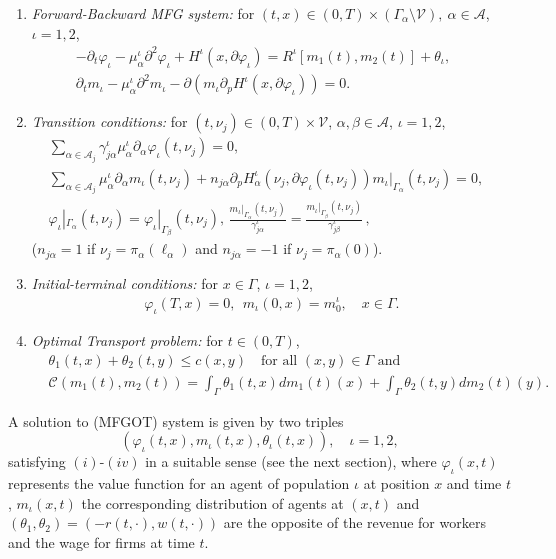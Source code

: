 \documentclass[smallextended,referee,envcountsect,]{svjour3}
\newcommand{\G}{\Gamma}
\newcommand{\cA}{{\mathcal A}}
\newcommand{\cC}{{\mathcal C}}
\newcommand{\cV}{{\mathcal V}}
\renewcommand{\phi}{\varphi}
\renewcommand{\a}{{\alpha}}
\renewcommand{\b}{{\beta}}
\renewcommand{\th}{\theta}
\begin{document}
\begin{enumerate}
\item[$(i)$] {\it Forward-Backward MFG system:} for $(t, x)\in (0, T)\times(\Gamma_{\a}\setminus\cV),\ \a\in\cA$, $\iota=1,2$,
\begin{align*}
	&-\partial_t\phi_\iota-\mu^\iota_{\a}\partial^2\phi_\iota+H^\iota(x, \partial\phi_\iota)=R^\iota[m_1(t),m_2(t)]+\th_\iota,\qquad   \\
	&\partial_tm_\iota-\mu^\iota_{\a}\partial^2m_\iota-\partial(m_\iota\partial_pH^\iota(x, \partial\phi_\iota))=0.
\end{align*}
\item[$(ii)$] {\it Transition conditions: }for $(t, \nu_j)\in (0, T)\times\cV$, $\a,\b\in\cA$,  $\iota=1,2$,
\begin{align*}
	&\sum_{\a\in\cA_j}\gamma^\iota_{j\a}\mu^\iota_{\a}\partial_{\a}\phi_\iota(t, \nu_j)=0,\qquad &\\
	&\sum_{\a\in\cA_j}\mu^\iota_{\a}\partial_{\a}m_\iota(t, \nu_j)+n_{j\a}\partial_{p}H_\a^\iota\left(\nu_j, \partial\phi_\iota(t, \nu_j)\right)m_\iota|_{\Gamma_{\a}}(t, \nu_j)=0,\qquad&\\
	&\phi_\iota|_{\Gamma_{\a}}(t, \nu_j)=\phi_\iota|_{\Gamma_{\beta}}(t, \nu_j), \,\frac{m_\iota|_{\Gamma_{\a}}(t, \nu_j)}{\gamma^\iota_{j\a}}=\frac{m_\iota|_{\Gamma_\beta}(t, \nu_j)}{\gamma^\iota_{j\beta}}\, ,
\end{align*}
($n_{j\a}=1$ if  $\nu_j =\pi_{\alpha} (\ell_\alpha)$ 
and $n_{j\a}=-1$ if $\nu_j =    \pi_{\alpha} (0)$).
\item[$(iii)$] {\it Initial-terminal conditions:} for $x\in\Gamma$, $\iota=1,2$,
\begin{align*}
	\phi_\iota(T, x)=0, \ \ m_\iota(0, x)=m_0^\iota,\quad x\in\G.
\end{align*}
\item[$(iv)$] {\it Optimal Transport problem:} for $t\in (0, T)$,
\begin{align*}
	&\th_1(t, x)+\th_2(t, y)\leq c(x, y)\quad \text{for all $(x,y)\in\G$ and} \\
	& \cC(m_1(t), m_2(t))= \int_{\Gamma}\th_1(t, x)dm_1(t)(x)+\int_{\Gamma}\th_2(t, y)dm_2(t)(y).
\end{align*}
\end{enumerate}
A solution to {(MFGOT)} system is given by two triples $$(\phi_\iota(t, x), m_\iota(t, x), \th_\iota(t, x)), \quad \iota=1,2,$$ satisfying $(i)$-$(iv)$ in a suitable sense (see the next section), where $\phi_\iota(x,t)$ represents the value function for an agent of population $\iota$ at position $x$ and time $t$,  $m_\iota(x,t)$   the corresponding distribution  of agents at $(x,t)$ and $(\th_1,\th_2)=(-r(t, \cdot), w(t, \cdot))$ are the opposite of the revenue for workers and the wage for firms at time $t$.\\ 
\end{document}
